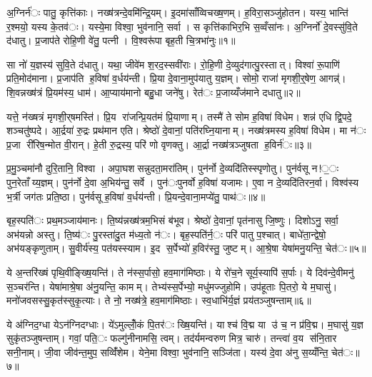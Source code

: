 
अ॒ग्निर्न॑ः पातु॒ कृत्ति॑काः। नख्ष॑त्रन्दे॒वमि॑न्द्रि॒यम्। इ॒दमा॑साँव्विचख्ष॒णम्। ह॒विरा॒सञ्जु॑होतन। यस्य॒ भान्ति॑ र॒श्मयो॒ यस्य के॒तव॑ः। यस्ये॒मा विश्वा॒ भुव॑नानि॒ सर्वा। स कृत्ति॑काभिर॒भि स॒व्वँसा॑नः। अ॒ग्निर्नो॑ दे॒वस्सु॑वि॒ते द॑धातु। प्र॒जाप॑ते रोहि॒णी वे॑तु॒ पत्नी। वि॒श्वरू॑पा बृह॒ती चि॒त्रभा॑नुः॥१॥

सा नो॑ य॒ज्ञस्य॑ सुवि॒ते द॑धातु। यथा॒ जीवे॑म श॒रद॒स्सवी॑राः। रो॒हि॒णी दे॒व्युद॑गात्पु॒रस्तात्। विश्वा॑ रू॒पाणि॑ प्रति॒मोद॑माना। प्र॒जाप॑ति ह॒विषा॑ व॒र्धय॑न्ती। प्रि॒या दे॒वाना॒मुप॑यातु य॒ज्ञम्। सोमो॒ राजा॑ मृगशी॒र्॒षेण॒ आगन्न्॑। शि॒वन्नख्ष॑त्रं प्रि॒यम॑स्य॒ धाम॑। आ॒प्याय॑मानो बहु॒धा जने॑षु। रेत॑ः प्र॒जाय्यँज॑माने दधातु॥२॥

यत्ते॒ न॑ख्षत्रं मृगशी॒र्‌षमस्ति॑। प्रि॒य रा॑जन्प्रि॒यत॑मं प्रि॒याणाम्। तस्मै॑ ते सोम ह॒विषा॑ विधेम। शन्न॑ एधि द्वि॒पदे॒ शञ्चतु॑ष्पदे। आ॒र्द्रया॑ रु॒द्रः प्रथ॑मान एति। श्रेष्ठो॑ दे॒वानां॒ पति॑रघ्नि॒यानाम्। नख्ष॑त्रमस्य ह॒विषा॑ विधेम। मा न॑ः प्र॒जा री॑रिष॒न्मोत वी॒रान्। हे॒ती रु॒द्रस्य॒ परि॑ णो वृणक्तु। आ॒र्द्रा नख्ष॑त्रञ्जुषता ह॒विर्न॑ः॥३॥

प्र॒मु॒ञ्चमा॑नौ दुरि॒तानि॒ विश्वा। अपा॒घशसन्नुदता॒मरा॑तिम्। पुन॑र्नो दे॒व्यदि॑तिस्स्पृणोतु। पुन॑र्वसू न!॒ः पुन॒रेताँय्य॒ज्ञम्। पुन॑र्नो दे॒वा अ॒भिय॑न्तु॒ सर्वे। पुन॑ःपुनर्वो ह॒विषा॑ यजामः। ए॒वा न दे॒व्यदि॑तिरन॒र्वा। विश्व॑स्य भ॒र्त्री जग॑तः प्रति॒ष्ठा। पुन॑र्वसू ह॒विषा॑ व॒र्धय॑न्ती। प्रि॒यन्दे॒वाना॒मप्ये॑तु॒ पाथ॑ः॥४॥

बृह॒स्पति॑ः प्रथ॒मञ्जाय॑मानः। ति॒ष्य॑न्नख्ष॑त्रम॒भिसं ब॑भूव। श्रेष्ठो॑ दे॒वानां॒ पृत॑नासु जि॒ष्णुः। दिशोऽनु॒ सर्वा॒ अभ॑यन्नो अस्तु। ति॒ष्य॑ः पु॒रस्ता॑दु॒त म॑ध्य॒तो न॑ः। बृह॒स्पति॑र्न॒ः परि॑ पातु प॒श्चात्। बाधे॑ता॒न्द्वेषो॒ अभ॑यङ्कृणुताम्। सु॒वीर्य॑स्य॒ पत॑यस्स्याम। इ॒द स॒र्पेभ्यो॑ ह॒विर॑स्तु॒ जुष्टम्। आ॒श्रे॒षा येषा॑मनु॒यन्ति॒ चेत॑ः॥५॥

ये अ॒न्तरि॑ख्षं पृथि॒वीङ्ख्षि॒यन्ति॑। ते न॑स्स॒र्पासो॒ हव॒माग॑मिष्ठाः। ये रो॑च॒ने सूर्य॒स्यापि॑ स॒र्पाः। ये दिव॑न्दे॒वीमनु॑ स॒ञ्चर॑न्ति। येषा॑माश्रे॒षा अ॑नु॒यन्ति॒ कामम्। तेभ्य॑स्स॒र्पेभ्यो॒ मधु॑मज्जुहोमि। उप॑हूताः पि॒तरो॒ ये म॒घासु॑। मनो॑जवसस्सु॒कृत॑स्सुकृ॒त्याः। ते नो॒ नख्ष॑त्रे॒ हव॒माग॑मिष्ठाः। स्व॒धाभि॑र्य॒ज्ञं प्रय॑तञ्जुषन्ताम्॥६॥

ये अ॑ग्निद॒ग्धा येऽन॑ग्निदग्धाः। ये॑ऽमुल्लोँ॒कं पि॒तर॑ः ख्षि॒यन्ति॑। याश्च॑ वि॒द्म या उ॑ च॒ न प्र॑वि॒द्म। म॒घासु॑ य॒ज्ञ सुकृ॑तञ्जुषन्ताम्। गवां॒ पति॒ः फल्गु॑नीनामसि॒ त्वम्। तद॑र्यमन्वरुण मित्र॒ चारु॑। तन्त्वा॑ व॒य स॑नि॒तार सनी॒नाम्। जी॒वा जीव॑न्त॒मुप॒ सव्विँ॑शेम। येने॒मा विश्वा॒ भुव॑नानि॒ सञ्जि॑ता। यस्य॑ दे॒वा अ॑नु स॒य्यँन्ति॒ चेत॑ः॥७॥

